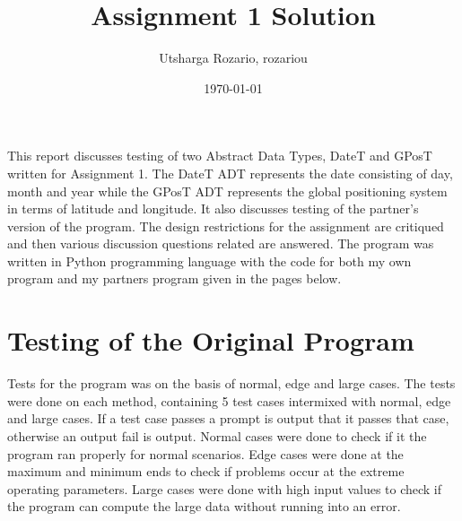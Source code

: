\documentclass[12pt]{article}
\title{Assignment 1 Solution}
\author{Utsharga Rozario, rozariou}
\date{\today}
\begin{document}
\maketitle

This report discusses testing of two Abstract Data Types, DateT and GPosT written for Assignment 1. The DateT ADT represents the date consisting of day, month and year while the GPosT ADT represents the global positioning system in terms of latitude and longitude. It also discusses testing of the partner's version of the program. The design restrictions for the assignment are critiqued and then various discussion questions related are answered. The program was written in Python programming language with the code for both my own program and my partners program given in the pages below.

\section{Testing of the Original Program}

Tests for the program was on the basis of normal, edge and large cases. The tests were done on each method, containing 5 test cases intermixed with normal, edge and large cases. If a test case passes a prompt is output that it passes that case, otherwise an output fail is output. Normal cases were done to check if it the program ran properly for normal scenarios. Edge cases were done at the maximum and minimum ends to check if problems occur at the extreme operating parameters.
Large cases were done with high input values to check if the program can compute the large data without running into an error.
\end{document}
